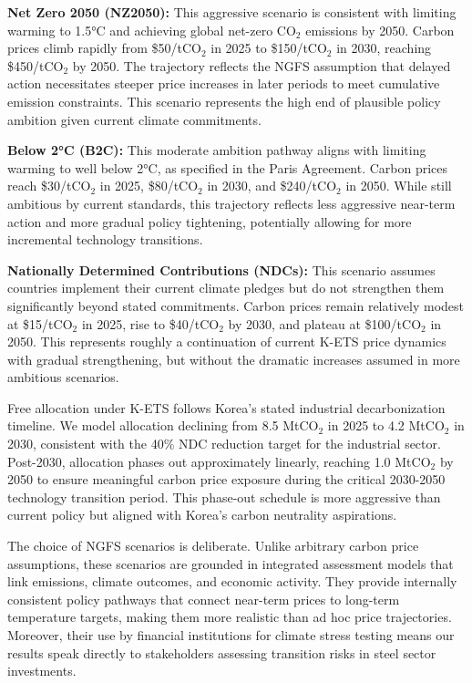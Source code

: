 \textbf{Net Zero 2050 (NZ2050):} This aggressive scenario is consistent with limiting warming to 1.5°C and achieving global net-zero CO$_2$ emissions by 2050. Carbon prices climb rapidly from \$50/tCO$_2$ in 2025 to \$150/tCO$_2$ in 2030, reaching \$450/tCO$_2$ by 2050. The trajectory reflects the NGFS assumption that delayed action necessitates steeper price increases in later periods to meet cumulative emission constraints. This scenario represents the high end of plausible policy ambition given current climate commitments.

\textbf{Below 2°C (B2C):} This moderate ambition pathway aligns with limiting warming to well below 2°C, as specified in the Paris Agreement. Carbon prices reach \$30/tCO$_2$ in 2025, \$80/tCO$_2$ in 2030, and \$240/tCO$_2$ in 2050. While still ambitious by current standards, this trajectory reflects less aggressive near-term action and more gradual policy tightening, potentially allowing for more incremental technology transitions.

\textbf{Nationally Determined Contributions (NDCs):} This scenario assumes countries implement their current climate pledges but do not strengthen them significantly beyond stated commitments. Carbon prices remain relatively modest at \$15/tCO$_2$ in 2025, rise to \$40/tCO$_2$ by 2030, and plateau at \$100/tCO$_2$ in 2050. This represents roughly a continuation of current K-ETS price dynamics with gradual strengthening, but without the dramatic increases assumed in more ambitious scenarios.

Free allocation under K-ETS follows Korea's stated industrial decarbonization timeline. We model allocation declining from 8.5 MtCO$_2$ in 2025 to 4.2 MtCO$_2$ in 2030, consistent with the 40\% NDC reduction target for the industrial sector. Post-2030, allocation phases out approximately linearly, reaching 1.0 MtCO$_2$ by 2050 to ensure meaningful carbon price exposure during the critical 2030-2050 technology transition period. This phase-out schedule is more aggressive than current policy but aligned with Korea's carbon neutrality aspirations.

The choice of NGFS scenarios is deliberate. Unlike arbitrary carbon price assumptions, these scenarios are grounded in integrated assessment models that link emissions, climate outcomes, and economic activity. They provide internally consistent policy pathways that connect near-term prices to long-term temperature targets, making them more realistic than ad hoc price trajectories. Moreover, their use by financial institutions for climate stress testing means our results speak directly to stakeholders assessing transition risks in steel sector investments.

